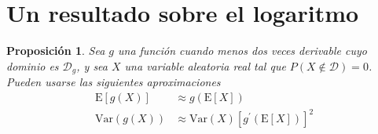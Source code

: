 \documentclass[12pt,letterpaper]{book}
\newtheorem{proposicion}[teorema]{Proposición}
\newcommand{\prima}{^{\prime}}
\newcommand{\E}[1]{\mathrm{E}\left[ #1 \right]}
\newcommand{\Var}[1]{\mathrm{Var}\left( #1 \right)}
\begin{document}
\section{Un resultado sobre el logaritmo}

\begin{proposicion}
\label{detalle:aprox}
Sea $g$ una función cuando menos dos veces derivable cuyo dominio es $\mathcal{D}_g$, y sea $X$ una variable aleatoria real tal que $P(X\notin \mathcal{D}) = 0$. 
%
Pueden usarse las siguientes aproximaciones
\begin{align}
\E{g(X)} &\approx g\left( \E{X} \right) \\
\Var{g(X)} &\approx \Var{X} \left[ g\prima \left( \E{X} \right) \right]^{2}
\end{align}
\end{proposicion}
\end{document}
